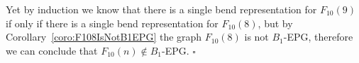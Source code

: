 \documentclass[9pt]{entcs}
\newtheorem{lema}{Lemma}[section]
\begin{document}
\begin{pf}
Yet by induction we know that there is a single bend representation for $F_{10}(9)$ if only if there is a single bend representation for $F_{10}(8)$, but by Corollary~\ref{coro:F108IsNotB1EPG} the graph $F_{10}(8)$ is not $B_1$-EPG, therefore we can conclude that $F_{10}(n) \notin B_1$-EPG.
 $\square$\end{pf} 


% 





% 

\end{document}
